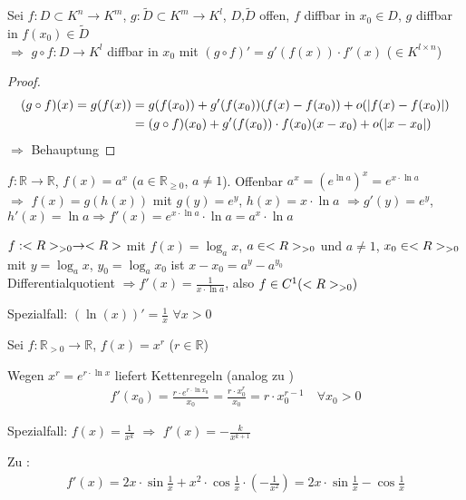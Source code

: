 \begin{proposition}[Kettenregel]
	Sei $f:D\subset K^n\to K^m$, $g:\tilde{D}\subset K^m\to K^l$, $D$,$\tilde{D}$ offen, $f$  \gls{diffbar} in $x_0\in D$, $g$  \gls{diffbar} in $f(x_0)\in\tilde{D}$ \\
	$\Rightarrow$ $g\circ f: D\to K^l$  \gls{diffbar} in $x_0$ mit $(g\circ f)' = g'(f(x))\cdot f'(x)$ ($\in K^{l\times n}$)
\end{proposition}
\begin{proof}
	\begin{align}
		(g\circ f)(x)  = g(f(x)) &= g(f(x_0)) + g'(f(x_0))(f(x)-f(x_0)) + o(\vert f(x)-f(x_0)\vert) \notag \\
		&= (g\circ f)(x_0) + g'(f(x_0))\cdot f(x_0)(x-x_0) + o(\vert x-x_0\vert)
	\end{align}
	$\Rightarrow$ Behauptung
\end{proof}

\begin{example}[$x$ im Exponenten]
	$f:\mathbb{R}\to \mathbb{R}$, $f(x) = a^x$ ($a\in\mathbb{R}_{\ge 0}$, $a\neq 1$).
	Offenbar $a^x = \left(e^{\ln a}\right)^x = e^{x\cdot \ln a}$\\
	$\Rightarrow$ $f(x) = g(h(x))$ mit $g(y) = e^y$, $h(x) = x\cdot \ln a$
	$\Rightarrow g'(y)=e^y$, $h'(x)=\ln a\Rightarrow f'(x)=e^{x\cdot \ln a}\cdot \ln a=a^x\cdot\ln a$
\end{example}

\begin{example}[Logarithmus]
	$f:<R>_{>0}\to <R>$ mit $f(x)=\log_a x$, $a\in<R>_{>0}$ und $a\neq 1$, $x_0\in <R>_{>0}$ \\
	mit $y=\log_a x$, $y_0=\log_a x_0$ ist $x-x_0=a^y-a^{y_0}$ \\
	Differentialquotient $\Rightarrow f'(x)=\frac{1}{x\cdot\ln a}$, also $f\in C^1(<R>_{>0})$
	
	Spezialfall: $(\ln(x))' = \frac{1}{x}$ $\forall x>0$
\end{example}

\begin{example}
	Sei $f:\mathbb{R}_{>0}\to \mathbb{R}$, $f(x) = x^r$ ($r\in\mathbb{R}$)
	
	Wegen $x^r = e^{r\cdot \ln x}$ liefert Kettenregeln (analog zu ) \begin{align*}
	f'(x_0) = \frac{r\cdot e^{r\cdot \ln x_0}}{x_0} = \frac{r\cdot x_0^r}{x_0} = r\cdot x_0^{r - 1} \quad\forall x_0>0
	\end{align*}
	
	Spezialfall: $f(x) = \frac{1}{x^k}$ $\Rightarrow$ $f'(x) = - \frac{k}{x^{k+1}}$
	
	Zu :\begin{align*}
	f'(x) = 2x\cdot \sin\frac{1}{x} + x^2\cdot \cos\frac{1}{x} \cdot \left( - \frac{1}{x^2}\right) = 2x\cdot \sin\frac{1}{x} - \cos\frac{1}{x}
	\end{align*}
\end{example}

